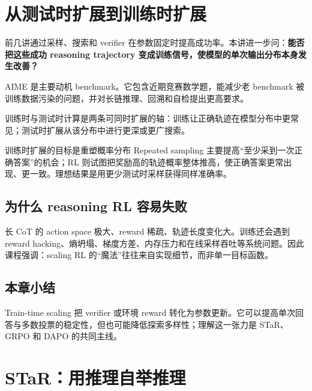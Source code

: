 \documentclass[a4paper]{article}
\begin{document}
\makelecturetitle

\section{从测试时扩展到训练时扩展}

前几讲通过采样、搜索和 verifier 在参数固定时提高成功率。本讲进一步问：\textbf{能否把这些成功 reasoning trajectory 变成训练信号，使模型的单次输出分布本身发生改善？}

AIME 是主要动机 benchmark。它包含近期竞赛数学题，能减少老 benchmark 被训练数据污染的问题，并对长链推理、回溯和自检提出更高要求。


训练时与测试时计算是两条可同时扩展的轴：训练让正确轨迹在模型分布中更常见；测试时扩展从该分布中进行更深或更广搜索。


\begin{importantbox}{训练时扩展的目标是重塑概率分布}
Repeated sampling 主要提高“至少采到一次正确答案”的机会；RL 则试图把奖励高的轨迹概率整体推高，使正确答案更常出现、更一致。理想结果是用更少测试时采样获得同样准确率。
\end{importantbox}

\subsection{为什么 reasoning RL 容易失败}

长 CoT 的 action space 极大、reward 稀疏、轨迹长度变化大。训练还会遇到 reward hacking、熵坍塌、梯度方差、内存压力和在线采样吞吐等系统问题。因此课程强调：scaling RL 的“魔法”往往来自实现细节，而非单一目标函数。

\subsection{本章小结}

Train-time scaling 把 verifier 或环境 reward 转化为参数更新。它可以提高单次回答与多数投票的稳定性，但也可能降低探索多样性；理解这一张力是 STaR、GRPO 和 DAPO 的共同主线。

\section{STaR：用推理自举推理}
\end{document}

